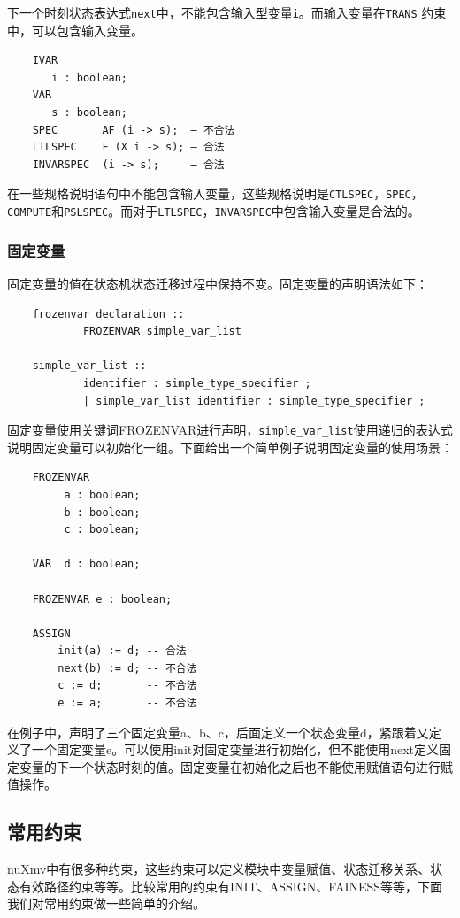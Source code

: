 下一个时刻状态表达式\verb|next|中，不能包含输入型变量\verb|i|。而输入变量在\verb|TRANS| 约束中，可以包含输入变量。

\begin{lstlisting}
    IVAR
       i : boolean;
    VAR
       s : boolean;
    SPEC       AF (i -> s);  – 不合法
    LTLSPEC    F (X i -> s); – 合法
    INVARSPEC  (i -> s);     – 合法
\end{lstlisting}

在一些规格说明语句中不能包含输入变量，这些规格说明是\verb|CTLSPEC|，\verb|SPEC|，\verb|COMPUTE|和\verb|PSLSPEC|。而对于\verb|LTLSPEC|，\verb|INVARSPEC|中包含输入变量是合法的。

\subsubsection{固定变量}
固定变量的值在状态机状态迁移过程中保持不变。固定变量的声明语法如下：

\begin{lstlisting}
    frozenvar_declaration ::
            FROZENVAR simple_var_list

    simple_var_list ::
            identifier : simple_type_specifier ;
            | simple_var_list identifier : simple_type_specifier ;
\end{lstlisting}

固定变量使用关键词FROZENVAR进行声明，\verb|simple_var_list|使用递归的表达式说明固定变量可以初始化一组。下面给出一个简单例子说明固定变量的使用场景：

\begin{lstlisting}
    FROZENVAR
         a : boolean;
         b : boolean;
         c : boolean;

    VAR  d : boolean;

    FROZENVAR e : boolean;

    ASSIGN
        init(a) := d; -- 合法
        next(b) := d; -- 不合法
        c := d;       -- 不合法
        e := a;       -- 不合法
\end{lstlisting}

在例子中，声明了三个固定变量a、b、c，后面定义一个状态变量d，紧跟着又定义了一个固定变量e。可以使用init对固定变量进行初始化，但不能使用next定义固定变量的下一个状态时刻的值。固定变量在初始化之后也不能使用赋值语句进行赋值操作。

\subsection{常用约束}
nuXmv中有很多种约束，这些约束可以定义模块中变量赋值、状态迁移关系、状态有效路径约束等等。比较常用的约束有INIT、ASSIGN、FAINESS等等，下面我们对常用约束做一些简单的介绍。


